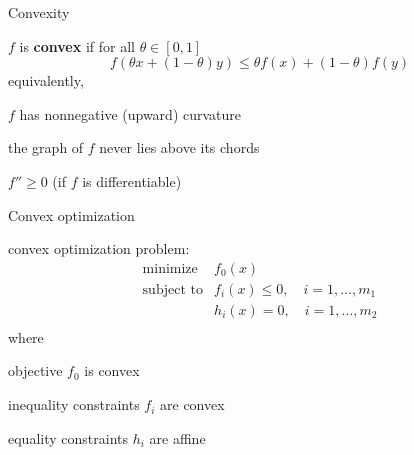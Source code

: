 \documentclass[presentation]{beamer}
\begin{document}
\begin{frame}{Convexity}

$f$ is \textbf{convex} if for all $\theta \in [0,1]$
$$
f(\theta x + (1-\theta)y ) \leq \theta f(x) + (1-\theta) f(y)
$$
\vspace{-.5in}
\vspace{-.5in}
equivalently,
\bit
\item $f$ has nonnegative (upward) curvature
\item the graph of $f$ never lies above its chords
\item $f'' \geq 0$ (if $f$ is differentiable)
\eit


\end{frame}

%
%

\begin{frame}{Convex optimization}

convex optimization problem:
\[
\begin{array}{ll}
\mbox{minimize}  & f_0(x) \\
\mbox{subject to} & f_i(x) \leq 0, \quad i=1, \ldots, m_1\\
& h_i(x) = 0, \quad i=1, \ldots, m_2\\
\end{array}
\]
where
\bit
\item objective $f_0$ is convex
\item inequality constraints $f_i$ are convex
\item equality constraints $h_i$ are affine
\eit

\end{frame}
\end{document}
